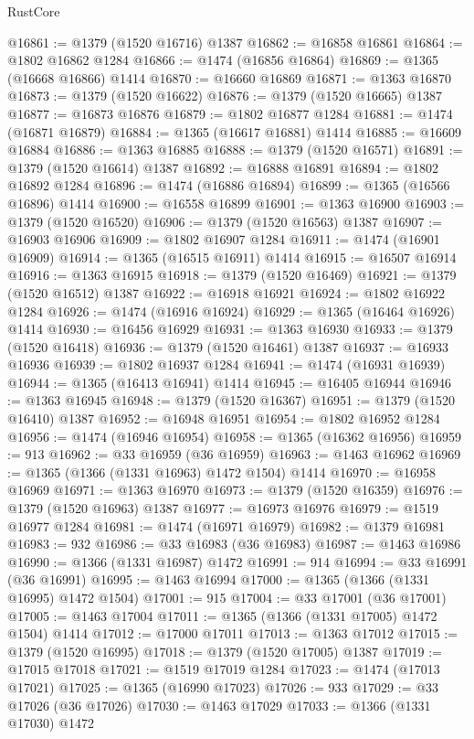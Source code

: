 \begin{lexlean}{RustCore}
\begin{coremodule}
@16861 := @1379 (@1520 @16716) @1387
@16862 := @16858 @16861
@16864 := @1802 @16862 @1284
@16866 := @1474 (@16856 @16864)
@16869 := @1365 (@16668 @16866) @1414
@16870 := @16660 @16869
@16871 := @1363 @16870
@16873 := @1379 (@1520 @16622)
@16876 := @1379 (@1520 @16665) @1387
@16877 := @16873 @16876
@16879 := @1802 @16877 @1284
@16881 := @1474 (@16871 @16879)
@16884 := @1365 (@16617 @16881) @1414
@16885 := @16609 @16884
@16886 := @1363 @16885
@16888 := @1379 (@1520 @16571)
@16891 := @1379 (@1520 @16614) @1387
@16892 := @16888 @16891
@16894 := @1802 @16892 @1284
@16896 := @1474 (@16886 @16894)
@16899 := @1365 (@16566 @16896) @1414
@16900 := @16558 @16899
@16901 := @1363 @16900
@16903 := @1379 (@1520 @16520)
@16906 := @1379 (@1520 @16563) @1387
@16907 := @16903 @16906
@16909 := @1802 @16907 @1284
@16911 := @1474 (@16901 @16909)
@16914 := @1365 (@16515 @16911) @1414
@16915 := @16507 @16914
@16916 := @1363 @16915
@16918 := @1379 (@1520 @16469)
@16921 := @1379 (@1520 @16512) @1387
@16922 := @16918 @16921
@16924 := @1802 @16922 @1284
@16926 := @1474 (@16916 @16924)
@16929 := @1365 (@16464 @16926) @1414
@16930 := @16456 @16929
@16931 := @1363 @16930
@16933 := @1379 (@1520 @16418)
@16936 := @1379 (@1520 @16461) @1387
@16937 := @16933 @16936
@16939 := @1802 @16937 @1284
@16941 := @1474 (@16931 @16939)
@16944 := @1365 (@16413 @16941) @1414
@16945 := @16405 @16944
@16946 := @1363 @16945
@16948 := @1379 (@1520 @16367)
@16951 := @1379 (@1520 @16410) @1387
@16952 := @16948 @16951
@16954 := @1802 @16952 @1284
@16956 := @1474 (@16946 @16954)
@16958 := @1365 (@16362 @16956)
@16959 := 913
@16962 := @33 @16959 (@36 @16959)
@16963 := @1463 @16962
@16969 := @1365 (@1366 (@1331 @16963) @1472 @1504) @1414
@16970 := @16958 @16969
@16971 := @1363 @16970
@16973 := @1379 (@1520 @16359)
@16976 := @1379 (@1520 @16963) @1387
@16977 := @16973 @16976
@16979 := @1519 @16977 @1284
@16981 := @1474 (@16971 @16979)
@16982 := @1379 @16981
@16983 := 932
@16986 := @33 @16983 (@36 @16983)
@16987 := @1463 @16986
@16990 := @1366 (@1331 @16987) @1472
@16991 := 914
@16994 := @33 @16991 (@36 @16991)
@16995 := @1463 @16994
@17000 := @1365 (@1366 (@1331 @16995) @1472 @1504)
@17001 := 915
@17004 := @33 @17001 (@36 @17001)
@17005 := @1463 @17004
@17011 := @1365 (@1366 (@1331 @17005) @1472 @1504) @1414
@17012 := @17000 @17011
@17013 := @1363 @17012
@17015 := @1379 (@1520 @16995)
@17018 := @1379 (@1520 @17005) @1387
@17019 := @17015 @17018
@17021 := @1519 @17019 @1284
@17023 := @1474 (@17013 @17021)
@17025 := @1365 (@16990 @17023)
@17026 := 933
@17029 := @33 @17026 (@36 @17026)
@17030 := @1463 @17029
@17033 := @1366 (@1331 @17030) @1472

\end{coremodule}
\end{lexlean}

